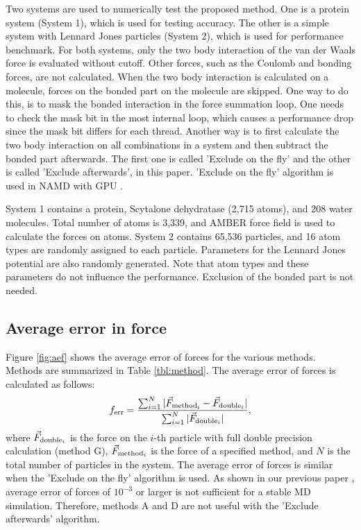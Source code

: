 Two systems are used to numerically test the proposed method.  One is
a protein system (System 1), which is used for testing accuracy.
The other is a simple system with Lennard Jones particles (System 2),
which is used for performance benchmark.  For both systems, only the
two body interaction of the van der Waals force is evaluated without
cutoff.  Other forces, such as the Coulomb and bonding forces, are not
calculated.  When the two body interaction is calculated on a
molecule, forces on the bonded part on the molecule are skipped.  One
way to do this, is to mask the bonded interaction in the force
summation loop. One needs to check the mask bit in the most internal
loop, which causes a performance drop since the mask bit differs for
each thread.  Another way is to first calculate the two body
interaction on all combinations in a system and then subtract the
bonded part afterwards.  The first one is called 'Exclude on the fly'
and the other is called 'Exclude afterwards', in this paper.
'Exclude on the fly' algorithm is used in NAMD with GPU \cite{NAMD1}.

System 1 contains a protein, Scytalone dehydratase (2,715 atoms), and
208 water molecules.  Total number of atoms is 3,339, and AMBER
\cite{AMBER} force field is used to calculate the forces on atoms.
System 2 contains 65,536 particles, and 
16 atom types are randomly assigned to each particle.
Parameters for the Lennard Jones potential are also randomly generated.
Note that atom types and these parameters do not influence the
performance.
Exclusion of the bonded part is not needed.



\subsection{Average error in force}

Figure \ref{fig:aef} shows the average error of forces for the 
various methods.
Methods are summarized in Table \ref{tbl:method}.
The average error of forces is calculated as follows:
\begin{equation}
f_{\rm err} = \frac{ \sum_{i=1}^{N} | \vec F_{{\rm method}_i} - \vec F_{{\rm double}_i}|}
              { \sum_{i=1}^{N} | \vec F_{{\rm double}_i}|},
\end{equation}
where $\vec F_{{\rm double}_i}$ is the force on the $i$-th particle with full double precision
calculation (method G), $\vec F_{{\rm method}_i}$ is the force of a specified method,
and $N$ is the total number of particles in the system.
The average error of forces is similar when the 'Exclude on the fly'
algorithm is used. As shown in our previous paper \cite{PS3Narumi},
average error of forces of $10^{-3}$ or larger is not sufficient for
a stable MD simulation. Therefore, methods A and D are not useful
with the 'Exclude afterwards' algorithm.

